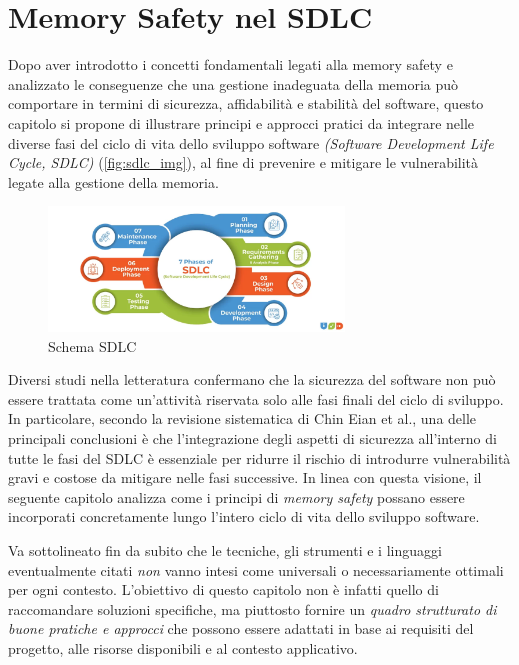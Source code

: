 \chapter{Memory Safety nel SDLC}
\label{cha:sdlc}

Dopo aver introdotto i concetti fondamentali legati alla memory safety e
analizzato le conseguenze che una gestione inadeguata della memoria può
comportare in termini di sicurezza, affidabilità e stabilità del software,
questo capitolo si propone di illustrare principi e approcci pratici da
integrare nelle diverse fasi del ciclo di vita dello sviluppo software \textit{(Software
Development Life Cycle, SDLC)} (\autoref{fig:sdlc_img}), al fine di prevenire e
mitigare le vulnerabilità legate alla gestione della memoria.

\begin{figure}[htbp]
  \centering
  \includegraphics[width=0.7\textwidth]{images/sdlc.png}
  \caption[Schema SDLC]{Schema SDLC\protect\footnotemark}
  \label{fig:sdlc_img}
\end{figure}

Diversi studi nella letteratura confermano che la sicurezza del software non può
essere trattata come un'attività riservata solo alle fasi finali del ciclo di sviluppo.
In particolare, secondo la revisione sistematica di Chin Eian et al.\cite{security_in_sdlc},
una delle principali conclusioni è che l'integrazione degli aspetti di sicurezza
all'interno di tutte le fasi del SDLC è essenziale per ridurre il rischio di
introdurre vulnerabilità gravi e costose da mitigare nelle fasi successive. In linea
con questa visione, il seguente capitolo analizza come i principi di \textit{memory
safety} possano essere incorporati concretamente lungo l'intero ciclo di vita dello
sviluppo software.

Va sottolineato fin da subito che le tecniche, gli strumenti e i linguaggi eventualmente
citati \textit{non} vanno intesi come universali o necessariamente ottimali per
ogni contesto. L'obiettivo di questo capitolo non è infatti quello di raccomandare
soluzioni specifiche, ma piuttosto fornire un \textit{quadro strutturato di
buone pratiche e approcci} che possono essere adattati in base ai requisiti del progetto,
alle risorse disponibili e al contesto applicativo.





